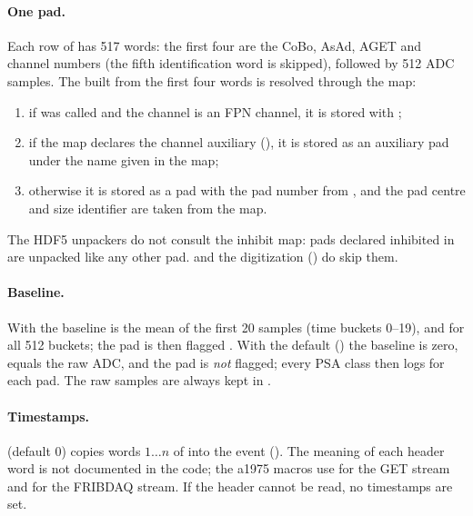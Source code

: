\paragraph{One pad.} Each row of  has 517 words: the first four are the CoBo,
AsAd, AGET and channel numbers (the fifth identification word is skipped), followed by 512 ADC
samples. The  built from the first four words is resolved through the map:
\begin{enumerate}
  \item if  was called and the channel is an FPN channel, it is stored with
        ;
  \item if the map declares the channel auxiliary (), it is stored as an
        auxiliary pad under the name given in the map;
  \item otherwise it is stored as a pad with the pad number from , and the
        pad centre and size identifier are taken from the map.
\end{enumerate}
The HDF5 unpackers do not consult the inhibit map: pads declared inhibited in  are
unpacked like any other pad.  and the digitization () do skip
them.

\paragraph{Baseline.} With  the baseline is the mean of the first
20 samples (time buckets 0--19), and  for all 512 buckets; the
pad is then flagged . With the default () the baseline is
zero,  equals the raw ADC, and the pad is \emph{not} flagged; every PSA class then logs
 for each pad. The raw samples are always
kept in .

\paragraph{Timestamps.}  (default 0) copies words $1\ldots n$ of
 into the event (). The meaning of
each header word is not documented in the code; the a1975 macros use  for the GET
stream and  for the FRIBDAQ stream. If the header cannot be read, no timestamps are
set.

